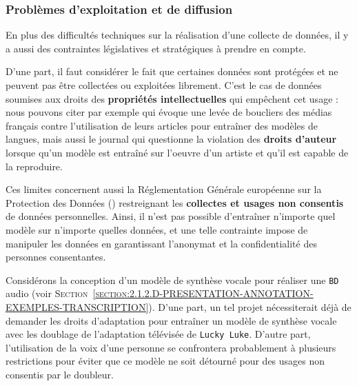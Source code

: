 		
		\subsubsection{Problèmes d'exploitation et de diffusion}
		\label{section:2.3.1.C-DEFIS-ANNOTATION-ASPECT-DONNEES-DROITS}
		
			En plus des difficultés techniques sur la réalisation d'une collecte de données, il y a aussi des contraintes législatives et stratégiques à prendre en compte.
			
			D'une part, il faut considérer le fait que certaines données sont protégées et ne peuvent pas être collectées ou exploitées librement.
			C'est le cas de données soumises aux droits des \textbf{propriétés intellectuelles} qui empêchent cet usage : nous pouvons citer par exemple \cite{loignon:2023:ia-medias-francais} qui évoque une levée de boucliers des médias français contre l'utilisation de leurs articles pour entraîner des modèles de langues, mais aussi le journal \cite{les-echos:2023:ia-auteur-game} qui questionne la violation des \textbf{droits d'auteur} lorsque qu'un modèle est entraîné sur l'oeuvre d'un artiste et qu'il est capable de la reproduire.
			
			Ces limites concernent aussi la Réglementation Générale européenne sur la Protection des Données (\cite{european-commission:2016:regulation-eu-2016}) restreignant les \textbf{collectes et usages non consentis} de données personnelles.
			Ainsi, il n'est pas possible d'entraîner n'importe quel modèle sur n'importe quelles données, et une telle contrainte impose de manipuler les données en garantissant l'anonymat et la confidentialité des personnes consentantes.
			
			\begin{leftBarExamples}
				Considérons la conception d'un modèle de synthèse vocale pour réaliser une \texttt{BD} audio (voir \textsc{Section~\ref{section:2.1.2.D-PRESENTATION-ANNOTATION-EXEMPLES-TRANSCRIPTION}}).
				D'une part, un tel projet nécessiterait déjà de demander les droits d'adaptation pour entraîner un modèle de synthèse vocale avec les doublage de l'adaptation télévisée de \texttt{Lucky Luke}.
				D'autre part, l'utilisation de la voix d'une personne se confrontera probablement à plusieurs restrictions pour éviter que ce modèle ne soit détourné pour des usages non consentis par le doubleur.
			\end{leftBarExamples}
			
